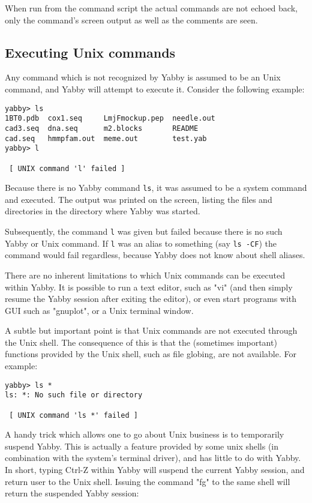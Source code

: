 When run from the command script the actual commands are not
echoed back, only the command's screen output as well as the
comments are seen.

\subsection{Executing Unix commands}


Any command which is not recognized by Yabby is assumed to be
an Unix command, and Yabby will attempt to execute it. Consider
the following example:

\begin{verbatim}
yabby> ls
1BT0.pdb  cox1.seq     LmjFmockup.pep  needle.out
cad3.seq  dna.seq      m2.blocks       README
cad.seq   hmmpfam.out  meme.out        test.yab
yabby> l

 [ UNIX command 'l' failed ]
\end{verbatim}

Because there is no Yabby command {\tt ls}, it was assumed to
be a system command and executed.  The output was printed on
the screen, listing the files and directories in the directory
where Yabby was started.

Subsequently, the command {\tt l} was given but failed because
there is no such Yabby or Unix command. If {\tt l} was an alias
to something (say {\tt ls -CF}) the command would fail regardless,
because Yabby does not know about shell aliases.

There are no inherent limitations to which Unix commands can be
executed within Yabby. It is possible to run a text editor, such
as "vi" (and then simply resume the Yabby session after exiting
the editor), or even start programs with GUI such as "gnuplot",
or a Unix terminal window.

A subtle but important point is that Unix commands are not executed
through the Unix shell.  The consequence of this is that the
(sometimes important) functions provided by the Unix shell, such
as file globing, are not available. For example:

\begin{verbatim}
yabby> ls *
ls: *: No such file or directory

 [ UNIX command 'ls *' failed ]
\end{verbatim}

A handy trick which allows one to go about Unix business is
to temporarily suspend Yabby. This is actually a feature provided
by some unix shells (in combination with the system's terminal driver),
and has little to do with Yabby. In short, typing Ctrl-Z within
Yabby will suspend the current Yabby session, and return user
to the Unix shell. Issuing the command "fg" to the same shell
will return the suspended Yabby session:

